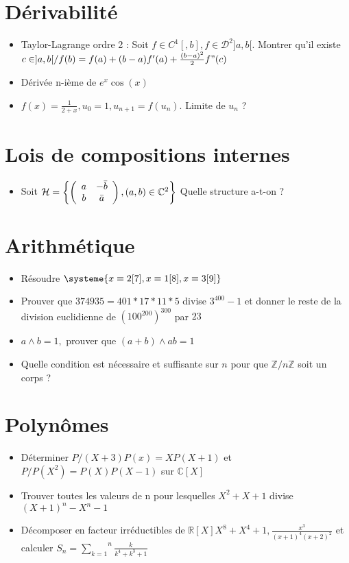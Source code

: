 \documentclass[a4paper, 11pt, french]{article}
\newcommand{\R}{\mathbb{R}}
\newcommand{\C}{\mathbb{C}}
\newcommand{\Z}{\mathbb{Z}}
\newcommand{\p}{\wedge}
\newcommand{\D}{\mathcal{D}}
\newcommand{\som}[2]{\overset{#2}{\underset{#1}{\sum}}}
\newcommand{\inv}[1]{\frac{1}{#1}}
\newcommand{\acc}[1]{\left\{ #1 \right\}}
\begin{document}
	\section*{Dérivabilité}
	\begin{itemize}
 		\item Taylor-Lagrange ordre 2 : Soit $f \in C^1[,b], f \in \D^2]a,b[.$ Montrer qu'il existe ${c \in ]a,b[} / f(b)=f(a)+(b-a)f'(a)+\frac{(b-a)^2}{2}f"(c)$
		\item Dérivée n-ième de $e^x\cos(x)$
		\item $f(x)=\inv{2+x}, u_0=1, u_{n+1}=f(u_n).$ Limite de $u_n$ ?
	\end{itemize}

	\section*{Lois de compositions internes}
	\begin{itemize}
 		\item Soit $\mathcal{H}=\acc{\left( \begin{array}{c c} a & -\bar{b} \\ b & \bar{a} \end{array} \right), (a,b) \in \C^2}$ Quelle structure a-t-on ? 
	\end{itemize}

	\section*{Arithmétique}
	\begin{itemize}
 		\item Résoudre $\systeme{x\equiv 2 [7], x \equiv 1[8], x \equiv 3[9]}$
		\item Prouver que $374 935=401*17*11*5$ divise $3^{400}-1$ et donner le reste de la division euclidienne de $(100^{200})^{300}$ par $23$
		\item $a \p b =1,$ prouver que $(a+b)\p ab=1$
		\item Quelle condition est nécessaire et suffisante sur $n$ pour que $\Z/n\Z$ soit un corps ?
	\end{itemize}

	\section*{Polynômes}
	\begin{itemize}
 		\item Déterminer $P / (X+3)P(x)=XP(X+1)$ et $P / P(X^2)=P(X)P(X-1)$ sur $\C[X]$
 		\item Trouver toutes les valeurs de n pour lesquelles $X^2+X+1$ divise $(X+1)^n-X^n-1$
 		\item Décomposer en facteur irréductibles de $\R[X] X^8+X^4+1, \frac{x^3}{(x+1)^4(x+2)^2}$ et calculer $S_n=\som{k=1}{n}\frac{k}{k^4+k^3+1}$
	\end{itemize}
\end{document}
